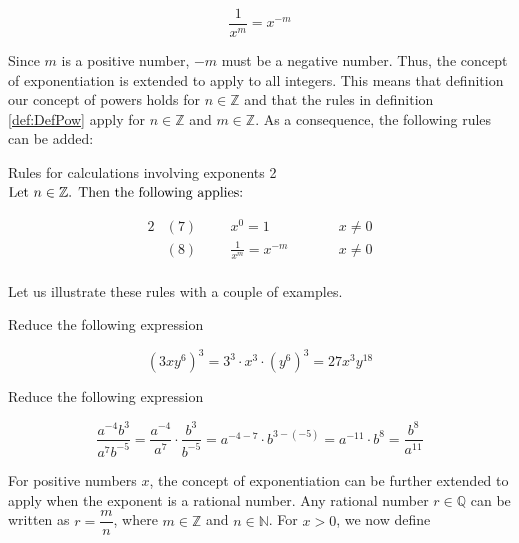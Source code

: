 \begin{equation*}
 \frac{1}{x^m} = x^{-m}   
\end{equation*}

Since \(m\) is a positive number, \(-m\) must be a negative number. Thus, the concept of exponentiation is extended to apply to all integers. This means that definition our concept of powers holds for \(n \in \mathbb{Z}\) and that the rules in definition \ref{def:DefPow} apply for \(n \in \mathbb{Z}\) and \(m \in \mathbb{Z}\). As a consequence, the following rules can be added:
\begin{custombox}{Rules for calculations involving exponents 2}
$\textnormal{Let } n \in \mathbb{Z} \textnormal{. Then the following applies:}$
\begin{fleqn}
\begin{alignat*}{2}
&(7) \hspace{1cm} x^0=1   &\qquad&   x \neq 0  \\
&(8) \hspace{1cm} \frac{1}{x^m}=x^{-m} &\qquad& x \neq 0 \\
\end{alignat*}
\end{fleqn}
\end{custombox}

Let us illustrate these rules with a couple of examples.

\begin{example} Reduce the following expression

    \begin{equation*}
\left(3 x y^6\right)^3=3^3 \cdot x^3 \cdot\left(y^6\right)^3=27 x^3 y^{18}
\end{equation*}
\end{example}

\begin{example} Reduce the following expression

\begin{equation*}
\frac{a^{-4} b^3}{a^7 b^{-5}}=\frac{a^{-4}}{a^7} \cdot \frac{b^3}{b^{-5}}=a^{-4-7} \cdot b^{3-(-5)}=a^{-11} \cdot b^8=\frac{b^8}{a^{11}}
\end{equation*}
\end{example}

For positive numbers \(x\), the concept of exponentiation can be further extended to apply when the exponent is a rational number. Any rational number \(r \in \mathbb{Q}\) can be written as \(r = \dfrac{m}{n}\), where \(m \in \mathbb{Z}\) and \(n \in \mathbb{N}\). For \(x > 0\), we now define

